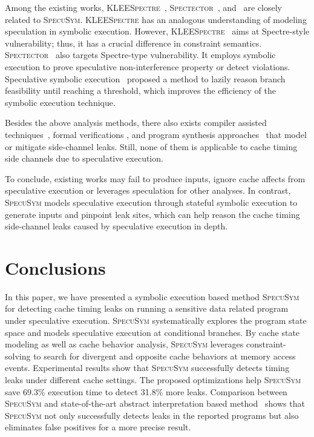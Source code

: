 \documentclass[sigconf,screen]{acmart}
\newcommand\ignore[1]{}
\newcommand{\SpecuSym}{\textsc{SpecuSym} }
\begin{document}
Among the existing works, \textsc{KLEESpectre}~\cite{WangCBMR19}, 
\textsc{Spectector}~\cite{GuarnieriKMRS19}, and~\cite{ZhangCW12} are 
closely related to \textsc{SpecuSym}. \textsc{KLEESpectre}
\cite{WangCBMR19} has an analogous understanding of modeling speculation 
in symbolic execution. However, \textsc{KLEESpectre}~\cite{WangCBMR19} 
aims at Spectre-style vulnerability; thus, it has a crucial difference 
in constraint semantics. \textsc{Spectector}~\cite{WangCBMR19} also 
targets Spectre-type vulnerability. It employs symbolic execution to 
prove speculative non-interference property or detect violations. 
Speculative symbolic execution~\cite{ZhangCW12} proposed a method to 
lazily reason branch feasibility until reaching a threshold, which 
improves the efficiency of the symbolic execution technique.



Besides the above analysis methods, there also exists compiler assisted 
techniques~\cite{DoychevK17,WangS17,SungPW18,WuGSW18,WangSW19}, formal 
verifications 
\cite{EldibWS14,EldibWTS14,ChenFD17,SousaD16,AntoGHKTW17,ZhangGSW18}, 
and program synthesis approaches~\cite{MaffeiR17,EldibW14,EldibWW16}
that model or mitigate side-channel leaks. Still, none of them is 
applicable to cache timing side channels due to speculative execution.



\ignore{
Doychev et al.~\cite{DoychevK17}studied that compiler optimization can 
remove cache side channels. Sung et al.~\cite{SungPW18} developed a 
compiler frontend transformation that models cache timing behaviors 
for verification purposes.
}


To conclude, existing works may fail to produce inputs, ignore cache 
affects from speculative execution or leverages speculation for other 
analyses. In contrast, \SpecuSym models speculative execution through 
stateful symbolic execution to generate inputs and pinpoint leak sites, 
which can help reason the cache timing side-channel leaks caused by 
speculative execution in depth. 


\section{Conclusions}
\label{sec:conclusion}


In this paper, we have presented a symbolic execution based method \SpecuSym 
for detecting cache timing leaks on running a sensitive data related program 
under speculative execution. \SpecuSym systematically explores the program 
state space and models speculative execution at conditional branches. By 
cache state modeling as well as cache behavior analysis, \SpecuSym leverages 
constraint-solving to search for divergent and opposite cache behaviors at 
memory access events. Experimental results show that \SpecuSym successfully 
detects timing leaks under different cache settings. The proposed optimizations 
help \SpecuSym save 69.3\% execution time to detect 31.8\% more leaks. 
Comparison between \SpecuSym and state-of-the-art abstract interpretation 
based method~\cite{WuW19} shows that \SpecuSym not only successfully detects 
leaks in the reported programs but also eliminates false positives for a more 
precise result.
\end{document}
